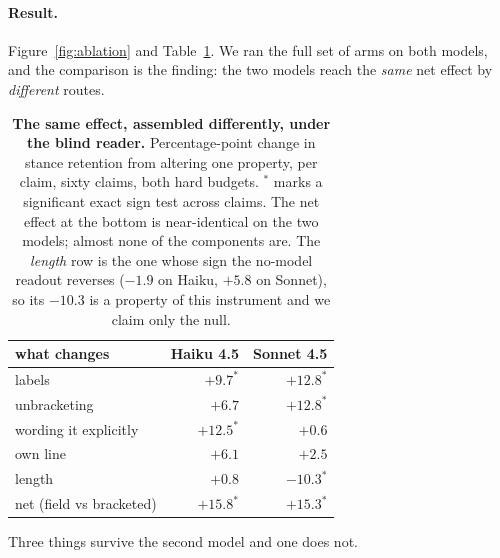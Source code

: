 \documentclass[11pt]{article}
\begin{document}
\paragraph{Result.} Figure~\ref{fig:ablation} and Table~\ref{tab:ablation}. We ran the
full set of arms on both models, and the comparison is the finding: the two models reach
the \emph{same} net effect by \emph{different} routes.

\begin{table}[t]
\centering\small
\begin{tabular}{@{}l r r@{}}
\toprule
what changes & Haiku 4.5 & Sonnet 4.5 \\
\midrule
labels                & $+9.7^{*}$  & $+12.8^{*}$ \\
unbracketing          & $+6.7$      & $+12.8^{*}$ \\
wording it explicitly & $+12.5^{*}$ & $+0.6$ \\
own line              & $+6.1$      & $+2.5$ \\
length                & $+0.8$      & $-10.3^{*}$ \\
\midrule
net (field vs bracketed) & $+15.8^{*}$ & $+15.3^{*}$ \\
\bottomrule
\end{tabular}
\caption{\textbf{The same effect, assembled differently, under the blind reader.}
Percentage-point change in
stance retention from altering one property, per claim, sixty claims, both hard budgets.
$^{*}$ marks a significant exact sign test across claims. The net effect at the bottom is
near-identical on the two models; almost none of the components are. The \emph{length}
row is the one whose sign the no-model readout reverses ($-1.9$ on Haiku, $+5.8$ on
Sonnet), so its $-10.3$ is a property of this instrument and we claim only the null.}
\label{tab:ablation}
\end{table}

Three things survive the second model and one does not.
\end{document}
